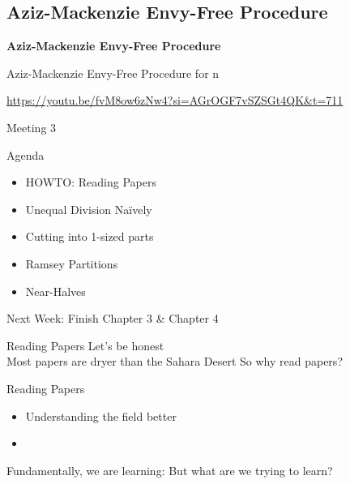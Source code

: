 \documentclass[aspectratio=169,xcolor=dvipsnames]{beamer}
\begin{document}
\subsection{Aziz-Mackenzie Envy-Free Procedure}
\begin{frame}
	\Huge{\centerline{\textbf{Aziz-Mackenzie Envy-Free Procedure}}}
\end{frame}
\begin{frame}{Aziz-Mackenzie Envy-Free Procedure for n}
	\centerline{\url{https://youtu.be/fvM8ow6zNw4?si=AGrOGF7vSZSGt4QK&t=711}}
\end{frame}
\begin{frame}{Meeting 3}
	\begin{block}{Agenda}
		\begin{itemize}
			\item HOWTO: Reading Papers
			\item Unequal Division Na{\"i}vely
			\item Cutting into 1-sized parts
			\item Ramsey Partitions
			\item Near-Halves
		\end{itemize}
	\end{block}
	Next Week: Finish Chapter 3 \& Chapter 4
\end{frame}
\begin{frame}{Reading Papers}
	Let's be honest\\Most papers are dryer than the Sahara Desert\pause
	\newline
	\newline
	So why read papers?
\end{frame}

\begin{frame}{Reading Papers}
	\begin{itemize}
		\item Understanding the field better
		\item 
	\end{itemize}
	Fundamentally, we are learning: But what are we trying to learn?
\end{frame}
\end{document}
